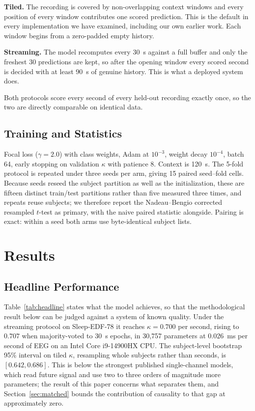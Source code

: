 \documentclass[conference]{IEEEtran}
\begin{document}
\textbf{Tiled.} The recording is covered by non-overlapping context windows and every position of
every window contributes one scored prediction. This is the default in every implementation we have
examined, including our own earlier work. Each window begins from a zero-padded empty history.

\textbf{Streaming.} The model recomputes every 30~s against a full buffer and only the freshest 30
predictions are kept, so after the opening window every scored second is decided with at least
90~s of genuine history. This is what a deployed system does.

Both protocols score every second of every held-out recording exactly once, so the two are directly
comparable on identical data.

\subsection{Training and Statistics}

Focal loss ($\gamma = 2.0$) with class weights, Adam at $10^{-3}$, weight decay $10^{-4}$, batch 64,
early stopping on validation $\kappa$ with patience 8. Context is 120~s. The 5-fold protocol is
repeated under three seeds per arm, giving 15 paired seed--fold cells. Because seeds reseed the
subject partition as well as the initialization, these are fifteen distinct train/test partitions
rather than five measured three times, and repeats reuse subjects; we therefore report the
Nadeau--Bengio corrected resampled $t$-test as primary, with the naive paired statistic alongside.
Pairing is exact: within a seed both arms use byte-identical subject lists.

\section{Results}

\subsection{Headline Performance}

Table~\ref{tab:headline} states what the model achieves, so that the methodological result below
can be judged against a system of known quality. Under the streaming protocol on Sleep-EDF-78 it
reaches $\kappa = 0.700$ per second, rising to $0.707$ when majority-voted to 30~s epochs, in
30{,}757 parameters at $0.026$~ms per second of EEG on an Intel Core i9-14900HX CPU. The
subject-level bootstrap 95\% interval on tiled $\kappa$, resampling whole subjects rather than
seconds, is $[0.642, 0.686]$. This is below the strongest published single-channel models, which
read future signal and use two to three orders of magnitude more parameters; the result of this
paper concerns what separates them, and Section~\ref{sec:matched} bounds the contribution of
causality to that gap at approximately zero.
\end{document}
